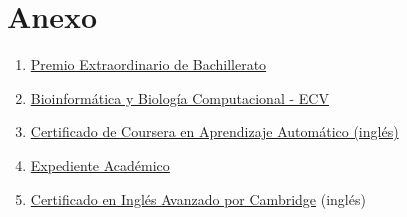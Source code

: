 \documentclass[paper=a4,fontsize=11pt]{article} %
\newcommand{\NewPart}[1]{\section*{
									{#1}}}
\begin{document}
\NewPart{Anexo}
\begin{enumerate}


\item \hyperlink{premio_extraordinario}{Premio Extraordinario de Bachillerato}
\item \hyperlink{complu}{Bioinformática y Biología Computacional - ECV}

\item \hyperlink{ML-Coursera}{Certificado de Coursera en Aprendizaje Automático (inglés)}

\item \hyperlink{exp-en}{Expediente Académico}
\item \hyperlink{cae}{Certificado en Inglés Avanzado por Cambridge} (inglés)
\end{enumerate}
%



\end{document}

